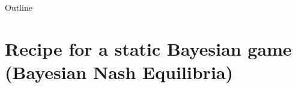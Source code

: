 

\maketitle

  \newcommand{\intuition}[1]{#1} %

\begin{frame}{Outline}
    \tableofcontents
\end{frame}





\section{Recipe for a static Bayesian game (Bayesian Nash Equilibria)}









